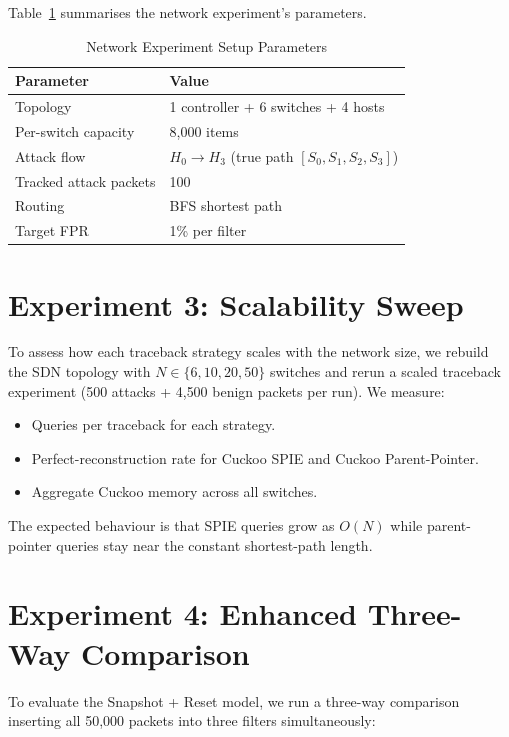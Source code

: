 \documentclass[12pt, a4paper]{report}
\begin{document}
Table~\ref{tab:net-setup} summarises the network experiment's parameters.

\begin{table}[H]
\centering
\caption{Network Experiment Setup Parameters}
\label{tab:net-setup}
\begin{tabular}{ll}
\toprule
\textbf{Parameter} & \textbf{Value} \\
\midrule
Topology                  & 1 controller + 6 switches + 4 hosts \\
Per-switch capacity       & 8{,}000 items \\
Attack flow               & $H_0 \to H_3$ (true path $[S_0,S_1,S_2,S_3]$) \\
Tracked attack packets    & 100 \\
Routing                   & BFS shortest path \\
Target FPR                & 1\% per filter \\
\bottomrule
\end{tabular}
\end{table}

\section{Experiment 3: Scalability Sweep}

To assess how each traceback strategy scales with the network size, we
rebuild the SDN topology with $N\in\{6,10,20,50\}$ switches and rerun a
scaled traceback experiment (500 attacks + 4{,}500 benign packets per
run). We measure:

\begin{itemize}[leftmargin=*]
  \item Queries per traceback for each strategy.
  \item Perfect-reconstruction rate for Cuckoo SPIE and Cuckoo
  Parent-Pointer.
  \item Aggregate Cuckoo memory across all switches.
\end{itemize}

The expected behaviour is that SPIE queries grow as $O(N)$ while
parent-pointer queries stay near the constant shortest-path length.

\section{Experiment 4: Enhanced Three-Way Comparison}

To evaluate the Snapshot + Reset model, we run a three-way comparison
inserting all 50{,}000 packets into three filters simultaneously:
\end{document}
